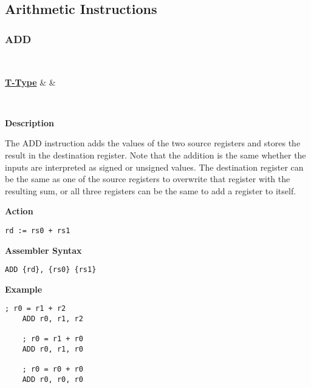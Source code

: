 \subsection{Arithmetic Instructions}

\subsubsection{ADD }\label{sec:ADD}

\vspace{3ex}

\begin{center}
	\begin{bytefield}[leftcurly=., leftcurlyspace=0pt]{32}
		 \\
		\begin{leftwordgroup}{\hyperref[sec:t-type]{\textbf{T-Type}}}
		 & 
		 &
		\end{leftwordgroup}\\
	\end{bytefield}
\end{center}

\textbf{Description}

The ADD instruction adds the values of the two source registers and stores the result in the destination register.
Note that the addition is the same whether the inputs are interpreted as signed or unsigned values.
The destination register can be the same as one of the source registers to overwrite that register with the resulting sum,
or all three registers can be the same to add a register to itself.

\vspace{3ex}

\textbf{Action}
\begin{lstlisting}[frame=single]
	rd := rs0 + rs1
\end{lstlisting}

\vspace{3ex}

\textbf{Assembler Syntax}
\begin{lstlisting}[frame=single]
	ADD {rd}, {rs0} {rs1}
\end{lstlisting}

\vspace{3ex}

\textbf{Example}
\begin{lstlisting}[frame=single]
	; r0 = r1 + r2
	ADD r0, r1, r2
	
	; r0 = r1 + r0
	ADD r0, r1, r0
	
	; r0 = r0 + r0
	ADD r0, r0, r0
\end{lstlisting}

